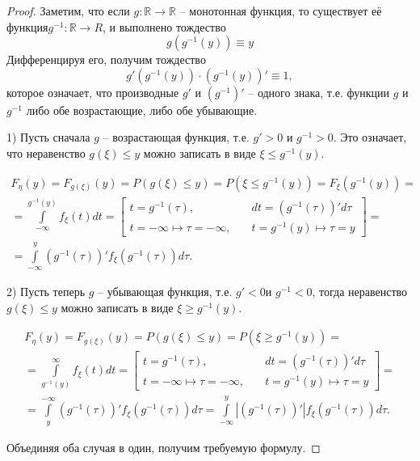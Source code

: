 \begin{proof}
Заметим, что если $g :\mathbb{R} \to \mathbb{R}$  -- монотонная функция, то существует её функция$ g^{-1} :\mathbb{R} \to R$, и выполнено тождество
\begin{equation*}
	g(g^{-1}(y))\equiv y 	
\end{equation*} 
Дифференцируя его, получим тождество
\begin{equation*}
	g'(g^{-1}(y)) \cdot (g^{-1} (y))' \equiv 1,
\end{equation*}
которое означает, что производные $g′$ и $(g^{-1})'$ --
одного знака, т.е. функции $g$ и $g^{-1}$ либо обе возрастающие, либо обе убывающие.


1) Пусть сначала $g$ -- возрастающая функция, т.е. $g' > 0$ и $g^{-1} > 0$. Это означает, что неравенство $g(\xi) \leq y$ можно записать в виде $ \xi \leq g^{-1}(y)$.

\begin{gather*}
	F_{\eta}(y) = F_{g(\xi)}(y) = P(g(\xi) \leq y) = P(\xi \leq g^{-1} (y)) = F_\xi (g^{-1} (y)) =\\=
	\int\limits^{g^{-1}(y)}_{-\infty} f_\xi(t) dt=
	\left[
	\begin{aligned}
		t = g^{-1} (\tau ),\qquad & dt = (g^{-1}(\tau ))' d\tau\\
		t = -\infty \mapsto \tau = -\infty,\quad & t = g^{-1}(y) \mapsto \tau = y
	\end{aligned}\right]=\\=
	\int\limits_{-\infty}^y (g^{-1}(\tau))' f_\xi(g^{-1}(\tau)) d\tau.
\end{gather*}



2) Пусть теперь $g$ -- убывающая функция, т.е. $g' < 0 $и $g^{-1} < 0$, тогда
неравенство $g(\xi) \leq y$ можно записать в виде $\xi \geq g^{-1} (y)$.

\begin{gather*}
	F_{\eta}(y) = F_{g(\xi)}(y) = P(g(\xi) \leq y) = P(\xi \geq g^{-1} (y)) =\\=
	\int\limits_{g^{-1}(y)}^{\infty} f_\xi(t) dt=
	\left[
	\begin{aligned}
		t = g^{-1} (\tau ),\qquad & dt = (g^{-1}(\tau ))' d\tau\\
		t = -\infty \mapsto \tau = -\infty,\quad & t = g^{-1}(y) \mapsto \tau = y
	\end{aligned}\right]=\\=\int\limits^{-\infty}_y (g^{-1}(\tau))' f_\xi(g^{-1}(\tau)) d\tau=
	\int\limits_{-\infty}^y \left|(g^{-1}(\tau))'\right| f_\xi(g^{-1}(\tau)) d\tau.
\end{gather*}

Объединяя оба случая в один, получим требуемую формулу.
\end{proof}

